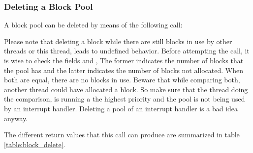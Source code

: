 \subsubsection{Deleting a Block Pool}

A block pool can be deleted by means of the following call:


Please note that deleting a block while there are still blocks in use by
other threads or this thread, leads to undefined behavior. Before
attempting the call, it is wise to check the fields
 and
, The former indicates the number of
blocks that the pool has and the latter indicates the number of blocks not
allocated. When both are equal, there are no blocks in use. Beware that
while comparing both, another thread could have allocated a block. So make
sure that the thread doing the comparison, is running a the highest priority
and the pool is not being used by an interrupt handler. Deleting a pool of
an interrupt handler is a bad idea anyway.

The different return values that this call can produce are summarized
in table \ref{table:block_delete}.  

